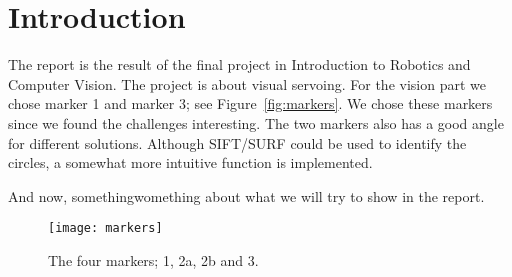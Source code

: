 \section{Introduction}
The report is the result of the final project in Introduction to Robotics and Computer Vision.
The project is about visual servoing. For the vision part we chose marker 1 and marker 3; see Figure~\vref{fig:markers}.
We chose these markers since we found the challenges interesting.
The two markers also has a good angle for different solutions.
Although SIFT/SURF could be used to identify the circles, a somewhat more intuitive function is implemented.

And now, somethingwomething about what we will try to show in the report.

\begin{figure}
\centering
\texttt{[image: markers]}
\caption{The four markers; 1, 2a, 2b and 3.}
\label{fig:markers}
\end{figure}
